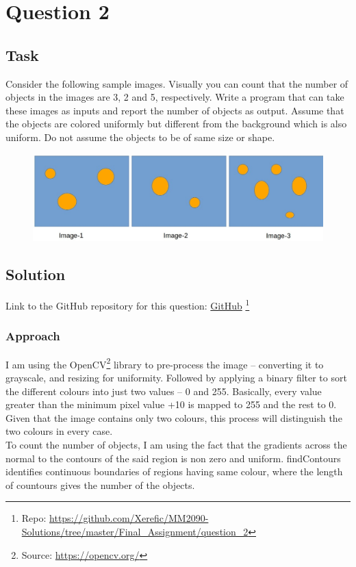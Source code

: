\section{Question 2}

\subsection{Task}
Consider the following sample images. Visually you can count that the number of objects in the images are 3, 2 and 5, respectively. Write a program that can take these images as inputs and report the number of objects as output. Assume that the objects are colored uniformly but different from the background which is also uniform. Do not assume the objects to be of same size or shape.
\begin{figure}[!ht]
\begin{center}
	\includegraphics[width=0.75\paperwidth]{question_2/question2.eps} 
\end{center}
\end{figure} 


\subsection{Solution}

Link to the GitHub repository for this question: \href{https://github.com/Xerefic/MM2090-Solutions/tree/master/Final_Assignment/question_2}{GitHub} \footnote{Repo: \url{https://github.com/Xerefic/MM2090-Solutions/tree/master/Final_Assignment/question_2}}

\subsubsection{Approach}
I am using the OpenCV\footnote{Source: \url{https://opencv.org/}} library to pre-process the image – converting it to grayscale, and resizing for uniformity. Followed by applying a binary filter to sort the different colours into just two values – 0 and 255. Basically, every value greater than the minimum pixel value +10 is mapped to 255 and the rest to 0. Given that the image contains only two colours, this process will distinguish the two colours in every case. \\
To count the number of objects, I am using the fact that the gradients across the normal to the contours of the said region is non zero and uniform. findContours identifies continuous boundaries of regions having same colour, where the length of countours gives the number of the objects.


